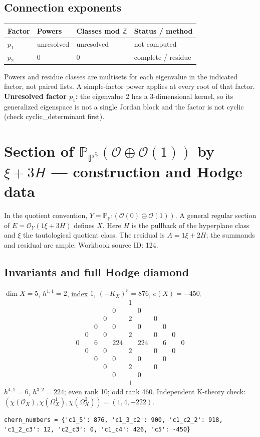 \documentclass[10pt,a4paper]{article}
\begin{document}
\subsection*{Connection exponents}
\begin{center}\begin{tabular}{llll}\toprule Factor & Powers & Classes mod $\mathbb Z$ & Status / method\\\midrule
$p_{1}$ & unresolved & unresolved & not computed\\
$p_{2}$ & $0$ & $0$ & complete / residue\\
\bottomrule\end{tabular}\end{center}
Powers and residue classes are multisets for each eigenvalue in the indicated factor, not paired lists. A simple-factor power applies at every root of that factor.
\textbf{Unresolved factor $p_{1}$:} the eigenvalue 2 has a 3-dimensional kernel, so its generalized eigenspace is not a single Jordan block and the factor is not cyclic (check cyclic\_determinant first).
\clearpage\section*{Section of $\mathbb P_{\mathbb P^{5}}(\mathcal O\oplus \mathcal O(1))$ by $\xi +3H$ --- construction and Hodge data}\label{entry:PB5-124}
In the quotient convention, $Y=\mathbb P_{\mathbb P^{5}}(\mathcal O(0)\oplus\mathcal O(1))$.
A general regular section of $E=\mathcal O_Y(1\xi+3H)$ defines $X$.
Here $H$ is the pullback of the hyperplane class and $\xi$ the tautological quotient class. The residual is $A=1\xi+2H$; the summands and residual are ample.
Workbook source ID: 124.
\subsection*{Invariants and full Hodge diamond}
$\dim X=5$, $h^{1,1}=2$, index $1$, $(-K_X)^5=876$, $e(X)=-450$.
\[\begin{array}{ccccccccccc}&&&&&1&&&&&\\&&&&0&&0&&&&\\&&&0&&2&&0&&&\\&&0&&0&&0&&0&&\\&0&&0&&2&&0&&0&\\0&&6&&224&&224&&6&&0\\&0&&0&&2&&0&&0&\\&&0&&0&&0&&0&&\\&&&0&&2&&0&&&\\&&&&0&&0&&&&\\&&&&&1&&&&&\end{array}\]
$h^{4,1}=6$, $h^{3,2}=224$; even rank 10; odd rank 460.
Independent K-theory check: $(\chi(\mathcal O_X),\chi(\Omega_X^1),\chi(\Omega_X^2))=(1, 4, -222)$.
\begin{lstlisting}
chern_numbers = {'c1_5': 876, 'c1_3_c2': 900, 'c1_c2_2': 918, 'c1_2_c3': 12, 'c2_c3': 0, 'c1_c4': 426, 'c5': -450}
\end{lstlisting}
\end{document}
